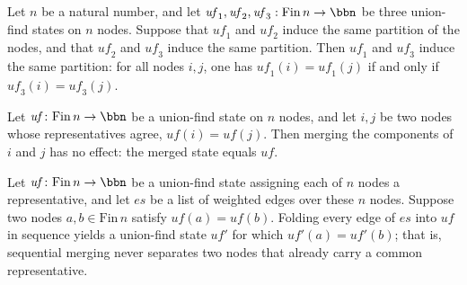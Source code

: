 \begin{lemma}
\label{Kruskal.UF.SamePartition.trans}
\leanok
{}
Let $n$ be a natural number, and let $\mathit{uf}_1, \mathit{uf}_2, \mathit{uf}_3 :
\mathrm{Fin}\,n \to \bbn$ be three union-find states on $n$ nodes. Suppose that
$\mathit{uf}_1$ and $\mathit{uf}_2$ induce the same partition of the nodes, and that
$\mathit{uf}_2$ and $\mathit{uf}_3$ induce the same partition. Then $\mathit{uf}_1$ and
$\mathit{uf}_3$ induce the same partition: for all nodes $i, j$, one has
$\mathit{uf}_1(i) = \mathit{uf}_1(j)$ if and only if $\mathit{uf}_3(i) =
\mathit{uf}_3(j)$.
\end{lemma}

\begin{lemma}
\label{Kruskal.merge_noop}
\leanok
{}
Let $\mathit{uf}\colon \mathrm{Fin}\,n \to \bbn$ be a union-find state on $n$ nodes, and
let $i,j$ be two nodes whose representatives agree, $\mathit{uf}(i) = \mathit{uf}(j)$.
Then merging the components of $i$ and $j$ has no effect: the merged state equals
$\mathit{uf}$.
\end{lemma}

\begin{lemma}
\label{Kruskal.mergeAll_preserves}
\leanok
{}
Let $\mathit{uf} \colon \mathrm{Fin}\,n \to \bbn$ be a union-find state assigning each
of $n$ nodes a representative, and let $\mathit{es}$ be a list of weighted edges over
these $n$ nodes. Suppose two nodes $a, b \in \mathrm{Fin}\,n$ satisfy $\mathit{uf}(a) =
\mathit{uf}(b)$. Folding every edge of $\mathit{es}$ into $\mathit{uf}$ in sequence
yields a union-find state $\mathit{uf}'$ for which $\mathit{uf}'(a) = \mathit{uf}'(b)$;
that is, sequential merging never separates two nodes that already carry a common
representative.
\end{lemma}


